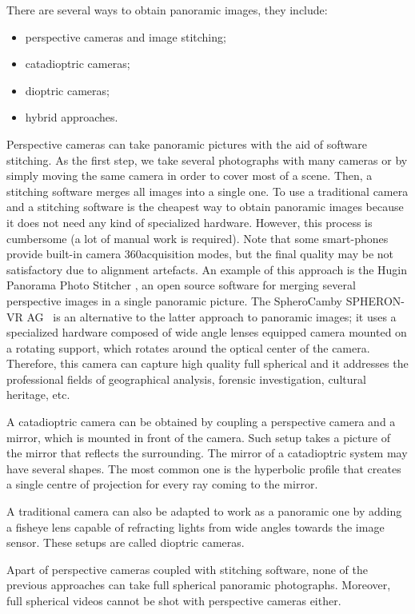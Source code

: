 There are several ways to obtain panoramic images, they include:
\begin{itemize}
	\item perspective cameras and image stitching;
	\item catadioptric cameras;
	\item dioptric cameras;
	\item hybrid approaches.
\end{itemize}

Perspective cameras can take panoramic pictures with the aid of software stitching. As the first step, we take several photographs with many cameras or by simply moving the same camera in order to cover most of a scene. Then, a stitching software merges all images into a single one. To use a traditional camera and a stitching software is the cheapest way to obtain panoramic images because it does not need any kind of specialized hardware. However, this process is cumbersome (a lot of manual work is required). Note that some smart-phones provide built-in camera 360\degree acquisition modes, but the final quality may be not satisfactory due to alignment artefacts.
An example of this approach is the Hugin Panorama Photo Stitcher 
\cite{hugin_photostitcher}, an open source software for merging several 
perspective images in a single panoramic picture.
The SpheroCam\texttrademark by SPHERON-VR AG\texttrademark~\cite{spheronvr}
is an alternative to 
the latter approach to panoramic images; it uses a specialized hardware composed
of wide angle lenses equipped camera mounted on a rotating support, which rotates around the optical center of the camera. Therefore, this camera can capture high quality full spherical and it addresses the professional fields of geographical analysis, forensic investigation, cultural heritage, etc.

A catadioptric camera can be obtained by coupling a perspective camera and a mirror, which is mounted in front of the camera. Such setup takes a picture of the mirror that reflects the surrounding. The mirror of a catadioptric system may have several shapes. The most common one is the hyperbolic profile that creates a single centre of projection for every ray coming to the mirror.

A traditional camera can also be adapted to work as a panoramic one by adding a fisheye lens capable of refracting lights from wide angles towards the image sensor. These setups are called dioptric cameras.

Apart of perspective cameras coupled with stitching software, none of the previous approaches can take full spherical panoramic photographs. Moreover, full spherical videos cannot be shot with perspective cameras either.

